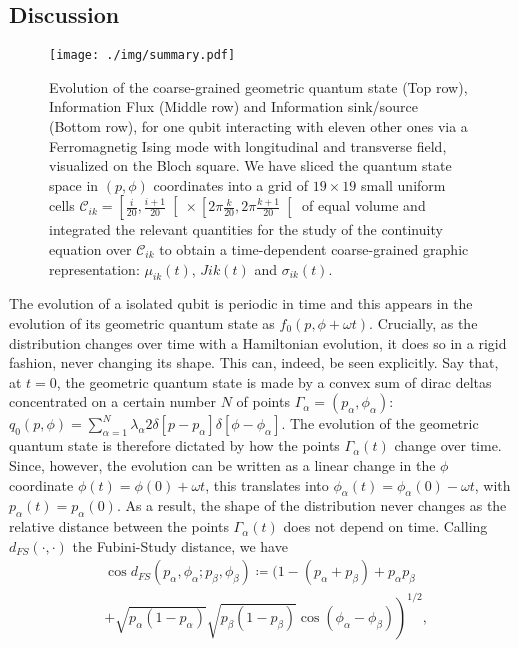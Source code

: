 \documentclass[%
 reprint,
 superscriptaddress,
 aps,
 pra,
]{revtex4-2}
\theoremstyle{definition}
\begin{document}
\subsection*{Discussion}
\begin{figure*}[t!]
\centering
\texttt{[image: ./img/summary.pdf]}
\caption{Evolution of the coarse-grained geometric quantum state (Top row), Information Flux (Middle row)
	and Information sink/source (Bottom row), for one qubit interacting with eleven other ones via
	a Ferromagnetig Ising mode with longitudinal and transverse field, visualized on the Bloch square. 
	We have sliced the quantum state space in $(p,\phi)$ coordinates into a grid of $19 \times 19$ small 
	uniform cells $\mathcal{C}_{ik} = \left[\frac{i}{20},\frac{i+1}{20}\right[ \times \left[2\pi\frac{k}{20},2\pi \frac{k+1}{20}\right[$ of 
	equal volume and integrated the relevant quantities for the study of the continuity equation over $\mathcal{C}_{ik}$ 
	to obtain a time-dependent coarse-grained graphic representation: $\mu_{ik}(t)$, $J{ik}(t)$ and $\sigma_{ik}(t)$.
	}
\label{fig:summary}
\end{figure*}
The evolution of a isolated qubit is periodic in time and this appears in the evolution 
of its geometric quantum state as $f_0(p,\phi+\omega t)$. Crucially, as the 
distribution changes over time with a Hamiltonian evolution, it does so in a 
rigid fashion, never changing its shape. This can, indeed, be seen explicitly. 
Say that, at $t=0$, the geometric quantum state is made by a convex sum
of dirac deltas concentrated on a certain number $N$ of points $\Gamma_\alpha = (p_\alpha,\phi_\alpha)$: 
$q_0(p,\phi) = \sum_{\alpha=1}^N \lambda_\alpha 2\delta\left[ p-p_\alpha\right] \delta\left[ \phi-\phi_\alpha\right]$.
The evolution of the geometric quantum state is therefore dictated by how 
the points $\Gamma_\alpha(t)$ change over time. Since, however, the evolution 
can be written as a linear change in the $\phi$ coordinate $\phi(t)=\phi(0)+\omega t$, this translates
into $\phi_\alpha(t) = \phi_\alpha(0)- \omega t$, with $p_\alpha(t)=p_\alpha(0)$.
As a result, the shape of the distribution never changes as the relative distance
between the points $\Gamma_\alpha(t)$ does not depend on time. Calling $d_{FS}(\cdot,\cdot)$
the Fubini-Study distance, we have
\begin{align}
&\cos d_{FS}(p_\alpha, \phi_\alpha;p_\beta,\phi_\beta) \coloneqq \Big(1-(p_\alpha+p_\beta)+p_\alpha p_\beta \nonumber \\
&\left. +\sqrt{p_\alpha(1-p_\alpha)}\sqrt{p_\beta(1-p_\beta)}\cos (\phi_\alpha-\phi_\beta)\right)^{1/2},
\end{align}
\end{document}
